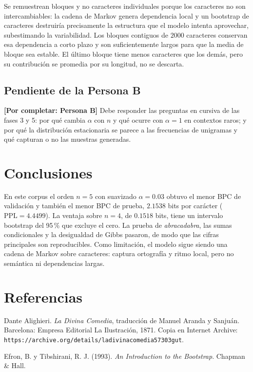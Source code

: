 \documentclass[11pt,letterpaper]{article}
\begin{document}
Se remuestrean bloques y no caracteres individuales porque los caracteres no
son intercambiables: la cadena de Markov genera dependencia local y un
bootstrap de caracteres destruiría precisamente la estructura que el modelo
intenta aprovechar, subestimando la variabilidad. Los bloques contiguos de
$2000$ caracteres conservan esa dependencia a corto plazo y son suficientemente
largos para que la media de bloque sea estable. El último bloque tiene menos
caracteres que los demás, pero su contribución se promedia por su longitud, no
se descarta.

\subsection{Pendiente de la Persona B}

\textbf{[Por completar: Persona B]} Debe responder las preguntas en cursiva de
las fases 3 y 5: por qué cambia $\alpha$ con $n$ y qué ocurre con $\alpha=1$ en
contextos raros; y por qué la distribución estacionaria se parece a las
frecuencias de unigramas y qué capturan o no las muestras generadas.

\section{Conclusiones}

En este corpus el orden $n=5$ con suavizado $\alpha=0.03$ obtuvo el menor BPC
de validación y también el menor BPC de prueba, $2.1538$ bits por carácter
($\mathrm{PPL}=4.4499$). La ventaja sobre $n=4$, de $0.1518$ bits, tiene un
intervalo bootstrap del 95\,\% que excluye el cero. La prueba de
\emph{abracadabra}, las sumas condicionales y la desigualdad de Gibbs pasaron,
de modo que las cifras principales son reproducibles. Como limitación, el
modelo sigue siendo una cadena de Markov sobre caracteres: captura ortografía y
ritmo local, pero no semántica ni dependencias largas.

\section*{Referencias}

Dante Alighieri. \emph{La Divina Comedia}, traducción de Manuel Aranda y
Sanjuán. Barcelona: Empresa Editorial La Ilustración, 1871. Copia en Internet
Archive: \texttt{https://archive.org/details/ladivinacomedia57303gut}.

Efron, B. y Tibshirani, R. J. (1993). \emph{An Introduction to the Bootstrap}.
Chapman \& Hall.
\end{document}
